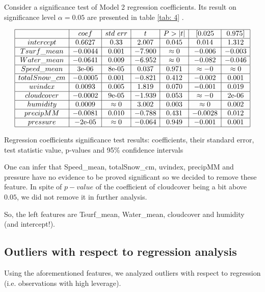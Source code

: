 \documentclass[12pt, bachelor, substylefile = algo_title.rtx]{disser}
\theoremstyle{definition}
\begin{document}
Consider a significance test of Model 2 regression coefficients. Its result on significance level $\alpha = 0.05$ are presented in table \ref{tab: 4} .
\begin{table}[!h]
$$
\begin{array}{|c|c|c|c|c|c|c|}
\hline
 & coef & std\ err & t & P>|t| & [0.025 & 0.975]\\
\hline
intercept & 0.6627 & 0.33 & 2.007 & 0.045 & 0.014 & 1.312\\
\hline
Tsurf\_mean & -0.0044 & 0.001 & -7.900 & \approx 0 & -0.006 & -0.003\\
\hline
Water\_mean & -0.0641 & 0.009 & -6.952 & \approx 0 & -0.082 & -0.046\\
\hline
Speed\_mean & 3\text{e-06} & 8\text{e-05} & 0.037 & 0.971 & \approx -0 & \approx 0\\
\hline
totalSnow\_cm & -0.0005 & 0.001 & -0.821 & 0.412 & -0.002 & 0.001\\
\hline
uvindex & 0.0093 & 0.005 & 1.819 & 0.070 & -0.001 & 0.019\\
\hline
cloudcover & -0.0002 & 9\text{e-05} & -1.939 & 0.053 & \approx -0 & 2\text{e-06}\\
\hline
humidity & 0.0009 & \approx 0 & 3.002 & 0.003 & \approx 0 & 0.002\\
\hline
precipMM & -0.0081 & 0.010 & -0.788 & 0.431 & -0.0028 & 0.012\\
\hline
pressure & -2\text{e-05} & \approx 0 & -0.064 & 0.949 & -0.001 & 0.001 \\
\hline
\end{array}
$$

\caption{Regression coefficients significance test results: coefficients, their standard error, test statistic value, p-values and 95\% confidence intervals}
\label{tab: 4}
\end{table}

One can infer that Speed\_mean, totalSnow\_cm, uvindex, precipMM and pressure have no evidence to be proved significant so we decided to remove these feature. In spite of $p-value$ of the coefficient of cloudcover being a bit above $0.05$, we did not remove it in further analysis.

So, the left features are Tsurf\_mean, Water\_mean, cloudcover and humidity (and intercept!).

\subsection{Outliers with respect to regression analysis}
Using the aforementioned features, we analyzed outliers with respect to regression (i.e. observations with high leverage).
\end{document}
